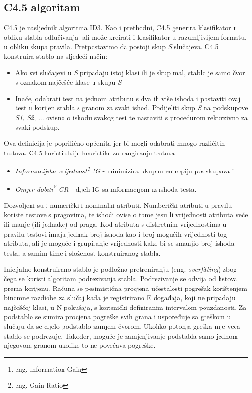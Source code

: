 \subsection{C4.5 algoritam}

C4.5 je nasljednik algoritma ID3. Kao i prethodni, C4.5 generira klasifikator u obliku stabla odlučivanja, ali može 
kreirati i klasifikator u razumljivijem formatu, u obliku skupa pravila. Pretpostavimo da postoji skup \textit{S} 
slučajeva. C4.5 konstruira stablo na sljedeći način:
\begin{itemize}
   \item Ako svi slučajevi u \textit{S} pripadaju istoj klasi ili je skup mal, stablo je samo čvor s oznakom najčešće klase u skupu \textit{S}
   \item Inače, odabrati test na jednom atributu s dva ili više ishoda i postaviti ovaj test u korijen stabla s granom za svaki ishod. Podijeliti skup \textit{S} na podskupove \textit{S1}, \textit{S2}, ... ovisno o ishodu svakog test te nastaviti s procedurom rekurzivno za svaki podskup.
\end{itemize}

Ova definicija je poprilično općenita jer bi mogli odabrati mnogo različitih testova. C4.5 koristi dvije heuristike za rangiranje testova
\begin{itemize}
   \item \textit{Informacijska vrijednost\footnote{eng. Information Gain} IG}  - minimizira ukupnu entropiju podskupova i
   \item \textit{Omjer dobiti\footnote{eng. Gain Ratio} GR} - dijeli IG sa informacijom iz ishoda testa.
\end{itemize}

Dozvoljeni su i numerički i nominalni atributi. Numberički atributi u pravilu koriste testove s pragovima, te ishodi
ovise o tome jesu li vrijednosti atributa veće ili manje (ili jednake) od praga. Kod atributa s diskretnim vrijednostima
u pravilu testovi imaju jednak broj ishoda kao i broj mogućih vrijednosti tog atributa, ali je moguće i grupiranje 
vrijednosti kako bi se smanjio broj ishoda testa, a samim time i složenost konstruiranog stabla.

Inicijalno konstruirano stablo je podložno pretreniranju (eng. \textit{overfitting}) zbog čega se koristi algoritam podrezivanja stabla. Podrezivanje se odvija od listova prema korijenu. Računa se pesimistična procjena učestalosti pogrešak korištenjem binomne razdiobe za slučaj kada je registrirano E događaja, koji ne pripadaju najčešćoj klasi, u N pokušaja, s korisnički definiranim intervalom pouzdanosti. Za podstablo se sumira procjena pogreške svih grana i uspoređuje sa greškom u slučaju da se cijelo podstablo zamjeni čvorom. Ukoliko potonja greška nije veća stablo se podrezuje. Također, moguće je zamjenjivanje podstabla samo jednom njegovom granom ukoliko to ne povećava pogreške\cite{Wu01}.

